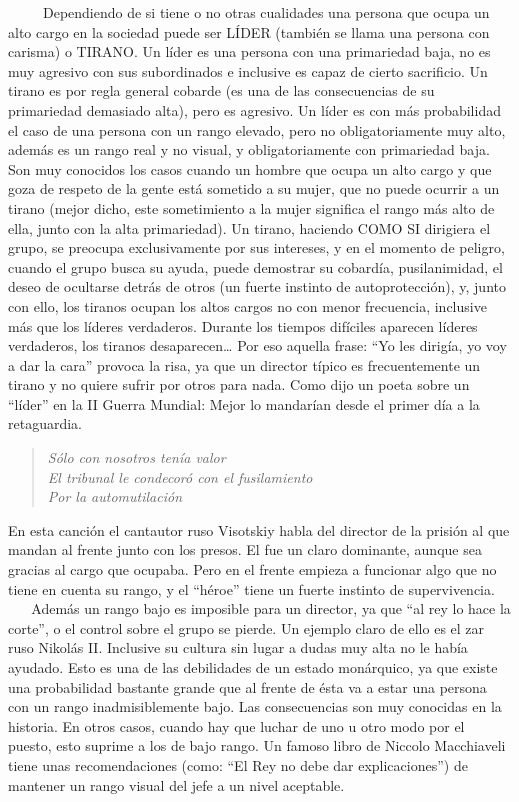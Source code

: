~ ~ ~ Dependiendo de si tiene o no otras cualidades una persona que
ocupa un alto cargo en la sociedad puede ser LÍDER (también se llama una
persona con carisma) o TIRANO. Un líder es una persona con una
primariedad baja, no es muy agresivo con sus subordinados e inclusive es
capaz de cierto sacrificio. Un tirano es por regla general cobarde (es
una de las consecuencias de su primariedad demasiado alta), pero es
agresivo. Un líder es con más probabilidad el caso de una persona con un
rango elevado, pero no obligatoriamente muy alto, además es un rango
real y no visual, y obligatoriamente con primariedad baja. Son muy
conocidos los casos cuando un hombre que ocupa un alto cargo y que goza
de respeto de la gente está sometido a su mujer, que no puede ocurrir a
un tirano (mejor dicho, este sometimiento a la mujer significa el rango
más alto de ella, junto con la alta primariedad). Un tirano, haciendo
COMO SI dirigiera el grupo, se preocupa exclusivamente por sus
intereses, y en el momento de peligro, cuando el grupo busca su ayuda,
puede demostrar su cobardía, pusilanimidad, el deseo de ocultarse detrás
de otros (un fuerte instinto de autoprotección), y, junto con ello, los
tiranos ocupan los altos cargos no con menor frecuencia, inclusive más
que los líderes verdaderos. Durante los tiempos difíciles aparecen
líderes verdaderos, los tiranos desaparecen\ldots{} Por eso aquella
frase: ``Yo les dirigía, yo voy a dar la cara'' provoca la risa, ya que
un director típico es frecuentemente un tirano y no quiere sufrir por
otros para nada. Como dijo un poeta sobre un ``líder'' en la II Guerra
Mundial: Mejor lo mandarían desde el primer día a la retaguardia.

\begin{quote}
 \emph{Sólo con nosotros tenía valor\\
El tribunal le condecoró con el fusilamiento\\
Por la automutilación}
\end{quote}


En esta canción el cantautor ruso Visotskiy habla del director de la
prisión al que mandan al frente junto con los presos. El fue un claro
dominante, aunque sea gracias al cargo que ocupaba. Pero en el frente
empieza a funcionar algo que no tiene en cuenta su rango, y el ``héroe''
tiene un fuerte instinto de supervivencia.\\
\hspace*{0.333em} ~ ~ Además un rango bajo es imposible para un
director, ya que ``al rey lo hace la corte'', o el control sobre el
grupo se pierde. Un ejemplo claro de ello es el zar ruso Nikolás II.
Inclusive su cultura sin lugar a dudas muy alta no le había ayudado.
Esto es una de las debilidades de un estado monárquico, ya que existe
una probabilidad bastante grande que al frente de ésta va a estar una
persona con un rango inadmisiblemente bajo. Las consecuencias son muy
conocidas en la historia. En otros casos, cuando hay que luchar de uno u
otro modo por el puesto, esto suprime a los de bajo rango. Un famoso
libro de Niccolo Macchiaveli tiene unas recomendaciones (como: ``El Rey
no debe dar explicaciones'') de mantener un rango visual del jefe a un
nivel aceptable.


